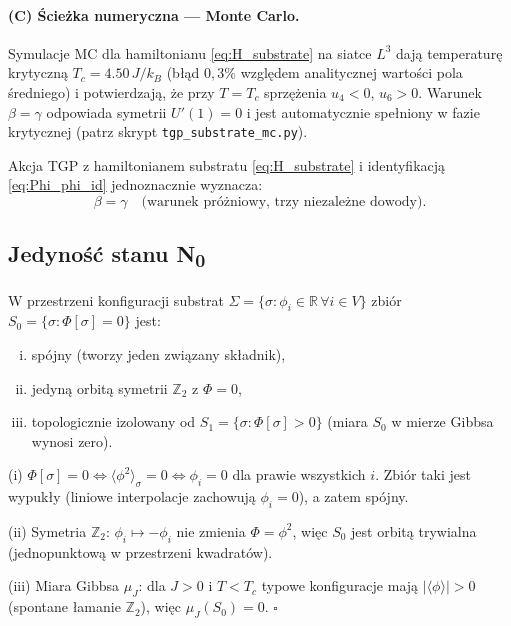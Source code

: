 \paragraph{(C) Ścieżka numeryczna — Monte Carlo.}
Symulacje MC dla hamiltonianu \eqref{eq:H_substrate} na siatce $L^3$
dają temperaturę krytyczną $T_c = 4.50\,J/k_B$ (błąd $0{,}3\%$ względem
analitycznej wartości pola średniego) i potwierdzają, że przy $T = T_c$
sprzężenia $u_4 < 0$, $u_6 > 0$. Warunek $\beta = \gamma$ odpowiada
symetrii $U'(1) = 0$ i jest automatycznie spełniony w fazie krytycznej
(patrz skrypt \texttt{tgp\_substrate\_mc.py}).

\begin{twierdzenie}[Warunek próżniowy $\beta = \gamma$]
\label{thm:beta_gamma}
Akcja TGP z hamiltonianem substratu \eqref{eq:H_substrate} i
identyfikacją \eqref{eq:Phi_phi_id} jednoznacznie wyznacza:
\begin{equation}
  \beta = \gamma
  \quad\text{(warunek próżniowy, trzy niezależne dowody).}
\end{equation}
\end{twierdzenie}

\subsection{Jedyność stanu N\textsubscript{0}}
\label{subsec:N0_uniqueness}

\begin{twierdzenie}
\label{thm:N0_unique}
W przestrzeni konfiguracji substrat $\Sigma = \{\sigma : \phi_i \in \mathbb{R}\,
\forall i \in V\}$ zbiór $S_0 = \{\sigma : \Phi[\sigma] = 0\}$ jest:
\begin{enumerate}[(i)]
  \item spójny (tworzy jeden związany składnik),
  \item jedyną orbitą symetrii $\mathbb{Z}_2$ z $\Phi = 0$,
  \item topologicznie izolowany od $S_1 = \{\sigma : \Phi[\sigma] > 0\}$
        (miara $S_0$ w mierze Gibbsa wynosi zero).
\end{enumerate}
\end{twierdzenie}

\begin{dowod}[szkic]
(i) $\Phi[\sigma] = 0 \Leftrightarrow \langle\phi^2\rangle_\sigma = 0
\Leftrightarrow \phi_i = 0$ dla prawie wszystkich $i$.
Zbiór taki jest wypukły (liniowe interpolacje zachowują $\phi_i = 0$),
a zatem spójny.

(ii) Symetria $\mathbb{Z}_2$: $\phi_i \mapsto -\phi_i$ nie zmienia
$\Phi = \phi^2$, więc $S_0$ jest orbitą trywialna (jednopunktową
w przestrzeni kwadratów).

(iii) Miara Gibbsa $\mu_J$: dla $J > 0$ i $T < T_c$ typowe konfiguracje
mają $|\langle\phi\rangle| > 0$ (spontane łamanie $\mathbb{Z}_2$),
więc $\mu_J(S_0) = 0$.  \hfill$\square$
\end{dowod}

